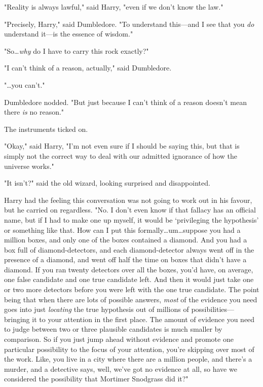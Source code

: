 "Reality is always lawful," said Harry, "even if we don’t know the law."

"Precisely, Harry," said Dumbledore. "To understand this—and I see that you
\emph{do} understand it—is the essence of wisdom."

"So…\emph{why} do I have to carry this rock exactly?"

"I can’t think of a reason, actually," said Dumbledore.

"…you can’t."

Dumbledore nodded. "But just because I can’t think of a reason doesn’t mean
there \emph{is} no reason."

The instruments ticked on.

"Okay," said Harry, "I’m not even sure if I should be saying this, but that is
simply not the correct way to deal with our admitted ignorance of how the
universe works."

"It isn’t?" said the old wizard, looking surprised and disappointed.

Harry had the feeling this conversation was not going to work out in his
favour, but he carried on regardless. "No. I don’t even know if that fallacy
has an official name, but if I had to make one up myself, it would be
‘privileging the hypothesis’ or something like that. How can I put this
formally…um…suppose you had a million boxes, and only one of
the boxes contained a diamond. And you had a box full of diamond-detectors, and
each diamond-detector always went off in the presence of a diamond, and went
off half the time on boxes that didn’t have a diamond. If you ran twenty
detectors over all the boxes, you’d have, on average, one false candidate and
one true candidate left. And then it would just take one or two more detectors
before you were left with the one true candidate. The point being that when
there are lots of possible answers, \emph{most} of the evidence you need goes
into just \emph{locating} the true hypothesis out of millions of
possibilities—bringing it to your attention in the first place. The amount of
evidence you need to judge between two or three plausible candidates is much
smaller by comparison. So if you just jump ahead without evidence and promote
one particular possibility to the focus of your attention, you’re skipping over
most of the work. Like, you live in a city where there are a million people,
and there’s a murder, and a detective says, well, we’ve got no evidence at all,
so have we considered the possibility that Mortimer Snodgrass did it?"

